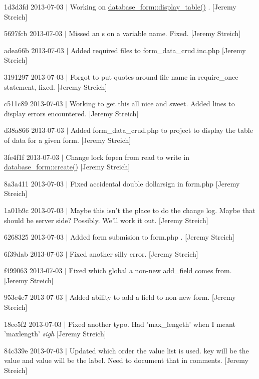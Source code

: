 \begin{DoxyItemize}
\item 1d3d3fd 2013-\/07-\/03 $|$ Working on \hyperlink{classdatabase__form_a73106bec9001ca0fe255e74a37982072}{database\-\_\-form\-::display\-\_\-table()} . \mbox{[}Jeremy Streich\mbox{]}
\item 5697fcb 2013-\/07-\/03 $|$ Missed an s on a variable name. Fixed. \mbox{[}Jeremy Streich\mbox{]}
\item adea66b 2013-\/07-\/03 $|$ Added required files to form\-\_\-data\-\_\-crud.\-inc.\-php \mbox{[}Jeremy Streich\mbox{]}
\item 3191297 2013-\/07-\/03 $|$ Forgot to put quotes around file name in require\-\_\-once statement, fixed. \mbox{[}Jeremy Streich\mbox{]}
\item c511c89 2013-\/07-\/03 $|$ Working to get this all nice and sweet. Added lines to display errors encountered. \mbox{[}Jeremy Streich\mbox{]}
\item d38a866 2013-\/07-\/03 $|$ Added form\-\_\-data\-\_\-crud.\-php to project to display the table of data for a given form. \mbox{[}Jeremy Streich\mbox{]}
\item 3fe4f1f 2013-\/07-\/03 $|$ Change lock fopen from read to write in \hyperlink{classdatabase__form_a2f217d182a55038d501b66f2a2d51abc}{database\-\_\-form\-::create()} \mbox{[}Jeremy Streich\mbox{]}
\item 8a3a411 2013-\/07-\/03 $|$ Fixed accidental double dollarsign in form.\-php \mbox{[}Jeremy Streich\mbox{]}
\item 1a01b9c 2013-\/07-\/03 $|$ Maybe this isn't the place to do the change log. Maybe that should be server side? Possibly. We'll work it out. \mbox{[}Jeremy Streich\mbox{]}
\item 6268325 2013-\/07-\/03 $|$ Added form submision to form.\-php . \mbox{[}Jeremy Streich\mbox{]}
\item 6f39dab 2013-\/07-\/03 $|$ Fixed another silly error. \mbox{[}Jeremy Streich\mbox{]}
\item f499063 2013-\/07-\/03 $|$ Fixed which global a non-\/new add\-\_\-field comes from. \mbox{[}Jeremy Streich\mbox{]}
\item 953e4e7 2013-\/07-\/03 $|$ Added ability to add a field to non-\/new form. \mbox{[}Jeremy Streich\mbox{]}
\item 18ee5f2 2013-\/07-\/03 $|$ Fixed another typo. Had 'max\-\_\-lengeth' when I meant 'maxlength' {\itshape sigh} \mbox{[}Jeremy Streich\mbox{]}
\item 84c339e 2013-\/07-\/03 $|$ Updated which order the value list is used. key will be the value and value will be the label. Need to document that in comments. \mbox{[}Jeremy Streich\mbox{]}

\end{DoxyItemize}
